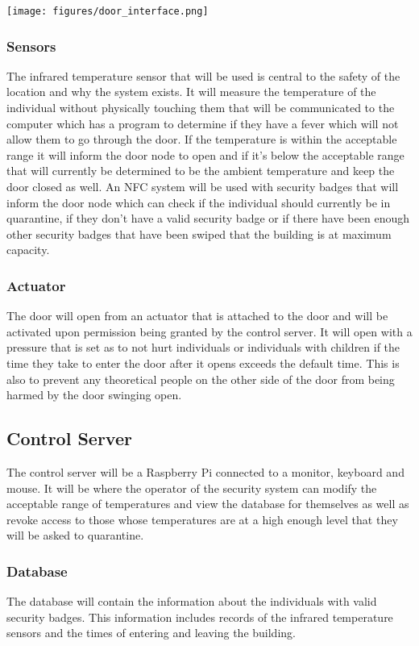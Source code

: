 \texttt{[image: figures/door\_interface.png]}

\subsubsection{Sensors}
The infrared temperature sensor that will be used is central to the safety of the location
and why the system exists. It will measure the temperature of the individual
without physically touching them that will be communicated to the computer which
has a program to determine if they have a fever which will not allow them to go
through the door. If the temperature is within the acceptable range it will
inform the door node to open and if it's below the acceptable range that will
currently be determined to be the ambient temperature and keep the door closed
as well. An NFC system will be used with security badges that will inform the door node
which can check if the individual should currently be in quarantine, if they
don't have a valid security badge or if there have been enough other
security badges that have been
swiped that the building is at maximum capacity.

\subsubsection{Actuator}
The door will open from an actuator that is attached to the door and will be
activated upon permission being granted by the control server. It will open with a
pressure that is set as to not hurt individuals or individuals with children if
the time they take to enter the door after it opens exceeds the default time.
This is also to prevent any theoretical people on the other side of the door
from being harmed by the door swinging open.

\subsection{Control Server}
The control server will be a Raspberry Pi connected to a monitor, keyboard and
mouse. It will be where the operator of the security system can modify the
acceptable range of temperatures and view the database for themselves as well as
revoke access to those whose temperatures are at a high enough level that they
will be asked to quarantine.

\subsubsection{Database}
The database will contain the information about the individuals with valid
security badges. This information includes records of the infrared temperature sensors and the times of entering and leaving the building.


